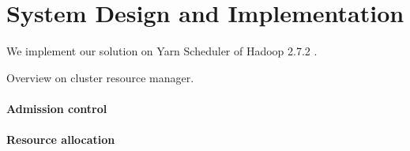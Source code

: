 \section{System Design and Implementation}

We implement our solution on Yarn Scheduler of Hadoop 2.7.2 \cite{yarn}.

Overview on cluster resource manager.

\paragraph{Admission control}


\paragraph{Resource allocation}
